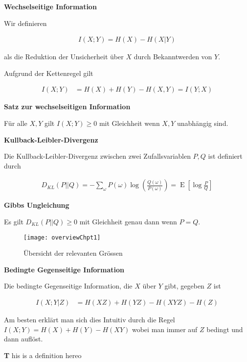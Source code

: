 \documentclass[25pt]{sciposter}
\newcommand{\E}{\operatorname{E}}
\newenvironment{defn}[1]{\begin{mdframed}[backgroundcolor=blue!10,innertopmargin=15pt, nobreak=true,innerbottommargin=15pt]
		\textbf{#1 }
	}
	{ 
	\end{mdframed}
}
\newenvironment{thm}[1]{\begin{mdframed}[nobreak=true,backgroundcolor=Emerald!10,innertopmargin=15pt, innerbottommargin=15pt]
		\textbf{#1 }
	}
	{ 
	\end{mdframed}
}
\begin{document}
\begin{multicols}{3}
		
		\begin{defn}{Wechselseitige Information}
			Wir definieren 
			
			\begin{align*}
				I(X;Y) = H(X) - H(X|Y)
			\end{align*}
			
			als die Reduktion der Unsicherheit über $X$ durch Bekanntwerden von $Y$.
			
			Aufgrund der Kettenregel gilt
			
			\begin{align*}
				I(X;Y) &= H(X) + H(Y) - H(X,Y) = I(Y;X)
			\end{align*}
			
		\end{defn}
		
		
		\begin{thm}{Satz zur wechselseitigen Information}
			Für alle $X,Y$ gilt $I(X;Y)\geq 0$ mit Gleichheit wenn $X,Y$ unabhängig sind.	
		\end{thm}
		
		
		\begin{defn}{Kullback-Leibler-Divergenz}
			Die Kullback-Leibler-Divergenz zwischen zwei Zufallsvariablen $P,Q$ ist definiert durch
			
			\begin{align*}
				D_{KL} (P||Q) = -\sum_{\omega}P(\omega) \log\left( \frac{Q(\omega)}{P(\omega)} \right) = \E \left[\log\frac{P}{Q}\right]
			\end{align*}
		\end{defn}
		
		\begin{thm}{Gibbs Ungleichung}
			Es gilt $D_{KL}(P||Q)\geq 0 $ mit Gleichheit genau dann wenn $P=Q$.
		\end{thm}
		
		
		\begin{figure}
			\centering
			\ifx
			\texttt{[image: overviewChpt1]}
			\caption{Übersicht der relevanten Grössen}
			\label{fig:overviewchpt1} \fi
		\end{figure}
		\begin{defn}{Bedingte Gegenseitige Information}
			Die bedingte Gegenseitige Information, die $X$ über $Y$ gibt, gegeben $Z$ ist 
			
			\begin{align*}
				I(X;Y|Z) &= H(XZ) + H(YZ)- H(XYZ) - H(Z)
			\end{align*}
			
			Am besten erklärt man sich dies Intuitiv durch die Regel $I(X;Y) = H(X) + H(Y) - H(XY)$ wobei man immer auf $Z$ bedingt und dann auflöst.
			
		\end{defn}
	
		\begin{defn}
			This is a definition here\varepsilon \varepsilon \varepsilon \varepsilon \varepsilon \varepsilon \varepsilon \varepsilon \varepsilon \varepsilon \mu \mu \mu \lambda \rho \varpi \pi o \tau \upsilon 
		\end{defn}
		
		\newpage
		
	\end{multicols}
\end{document}
